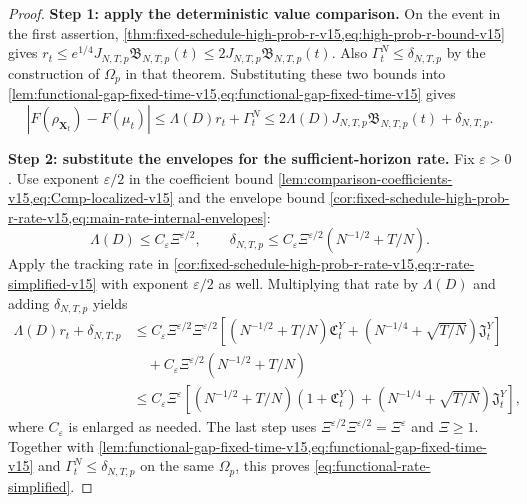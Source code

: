 \begin{proof}
\noindent\textbf{Step 1: apply the deterministic value comparison.}
On the event in the first assertion,
\cref{thm:fixed-schedule-high-prob-r-v15,eq:high-prob-r-bound-v15}
gives $r_t\le e^{1/4}J_{N,T,p}\mathfrak B_{N,T,p}(t)
\le2J_{N,T,p}\mathfrak B_{N,T,p}(t)$.
Also $\Gamma_t^N\le\delta_{N,T,p}$ by the construction of $\Omega_p$
in that theorem. Substituting these two bounds into
\cref{lem:functional-gap-fixed-time-v15,eq:functional-gap-fixed-time-v15} gives
\[
 |F(\rho_{\mathbf X_t})-F(\mu_t)|
 \le\Lambda(D)r_t+\Gamma_t^N
 \le2\Lambda(D)J_{N,T,p}\mathfrak B_{N,T,p}(t)+\delta_{N,T,p}.
\]
\par\noindent\textbf{Step 2: substitute the envelopes for the sufficient-horizon rate.}
Fix $\varepsilon>0$. Use exponent $\varepsilon/2$ in the coefficient
bound \cref{lem:comparison-coefficients-v15,eq:Ccmp-localized-v15} and the
envelope bound \cref{cor:fixed-schedule-high-prob-r-rate-v15,eq:main-rate-internal-envelopes}:
\[
 \Lambda(D)\le C_\varepsilon\Xi^{\varepsilon/2},\qquad
 \delta_{N,T,p}\le C_\varepsilon\Xi^{\varepsilon/2}(N^{-1/2}+T/N).
\]
Apply the tracking rate in
\cref{cor:fixed-schedule-high-prob-r-rate-v15,eq:r-rate-simplified-v15}
with exponent $\varepsilon/2$ as well. Multiplying that rate by
$\Lambda(D)$ and adding $\delta_{N,T,p}$ yields
\[
\begin{aligned}
 \Lambda(D)r_t+\delta_{N,T,p}
 &\le C_\varepsilon\Xi^{\varepsilon/2}\Xi^{\varepsilon/2}
 \left[(N^{-1/2}+T/N)\mathfrak C_t^Y
 +(N^{-1/4}+\sqrt{T/N})\mathfrak J_t^Y\right]\\
 &\quad+C_\varepsilon\Xi^{\varepsilon/2}(N^{-1/2}+T/N)\\
 &\le C_\varepsilon\Xi^\varepsilon
 \left[(N^{-1/2}+T/N)(1+\mathfrak C_t^Y)
 +(N^{-1/4}+\sqrt{T/N})\mathfrak J_t^Y\right],
\end{aligned}
\]
where $C_\varepsilon$ is enlarged as needed. The last step uses
$\Xi^{\varepsilon/2}\Xi^{\varepsilon/2}=\Xi^\varepsilon$ and $\Xi\ge1$.
Together with \cref{lem:functional-gap-fixed-time-v15,eq:functional-gap-fixed-time-v15}
and $\Gamma_t^N\le\delta_{N,T,p}$ on the same $\Omega_p$, this proves
\eqref{eq:functional-rate-simplified}.
\end{proof}
